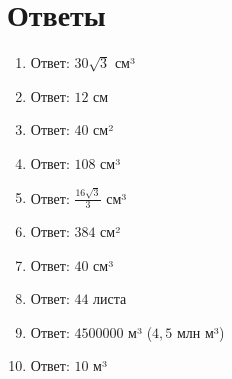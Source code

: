 \documentclass{umk-matematika}
\begin{document}
\section*{Ответы}

\begin{enumerate}
  \item Ответ: $30\sqrt{3}$ см³
  \item Ответ: $12$ см
  \item Ответ: $40$ см²
  \item Ответ: $108$ см³
  \item Ответ: $\frac{16\sqrt{3}}{3}$ см³
  \item Ответ: $384$ см²
  \item Ответ: $40$ см³
  \item Ответ: $44$ листа
  \item Ответ: $4500000$ м³ ($4{,}5$ млн м³)
  \item Ответ: $10$ м³
\end{enumerate}
\end{document}
